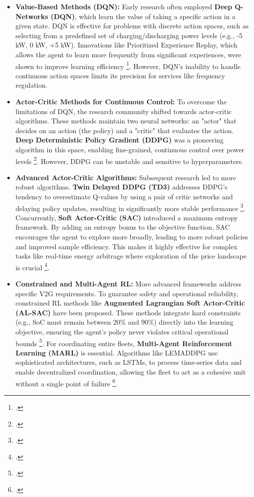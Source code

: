 \begin{itemize}
    \item \textbf{Value-Based Methods (DQN):} Early research often employed \textbf{Deep Q-Networks (DQN)}, which learn the value of taking a specific action in a given state. DQN is effective for problems with discrete action spaces, such as selecting from a predefined set of charging/discharging power levels (e.g., -5 kW, 0 kW, +5 kW). Innovations like Prioritized Experience Replay, which allows the agent to learn more frequently from significant experiences, were shown to improve learning efficiency \footcite{schaul2015prioritized}. However, DQN's inability to handle continuous action spaces limits its precision for services like frequency regulation.
    \item \textbf{Actor-Critic Methods for Continuous Control:} To overcome the limitations of DQN, the research community shifted towards actor-critic algorithms. These methods maintain two neural networks: an "actor" that decides on an action (the policy) and a "critic" that evaluates the action. \textbf{Deep Deterministic Policy Gradient (DDPG)} was a pioneering algorithm in this space, enabling fine-grained, continuous control over power levels \footcite{orfanoudakis2022deep, alfaverh2022optima}. However, DDPG can be unstable and sensitive to hyperparameters.
    \item \textbf{Advanced Actor-Critic Algorithms:} Subsequent research led to more robust algorithms. \textbf{Twin Delayed DDPG (TD3)} addresses DDPG's tendency to overestimate Q-values by using a pair of critic networks and delaying policy updates, resulting in significantly more stable performance \footcite{liu2023optimal, wang2022multi}. Concurrently, \textbf{Soft Actor-Critic (SAC)} introduced a maximum entropy framework. By adding an entropy bonus to the objective function, SAC encourages the agent to explore more broadly, leading to more robust policies and improved sample efficiency. This makes it highly effective for complex tasks like real-time energy arbitrage where exploration of the price landscape is crucial \footcite{orfanoudakis2022deep}.
    \item \textbf{Constrained and Multi-Agent RL:} More advanced frameworks address specific V2G requirements. To guarantee safety and operational reliability, constrained RL methods like \textbf{Augmented Lagrangian Soft Actor-Critic (AL-SAC)} have been proposed. These methods integrate hard constraints (e.g., SoC must remain between 20\% and 90\%) directly into the learning objective, ensuring the agent's policy never violates critical operational bounds \footcite{orfanoudakis2022deep}. For coordinating entire fleets, \textbf{Multi-Agent Reinforcement Learning (MARL)} is essential. Algorithms like LEMADDPG use sophisticated architectures, such as LSTMs, to process time-series data and enable decentralized coordination, allowing the fleet to act as a cohesive unit without a single point of failure \footcite{liu2023optimal}.
\end{itemize}

